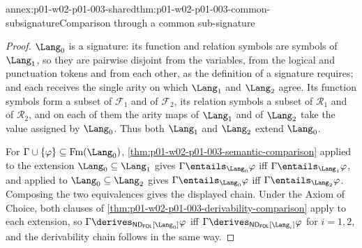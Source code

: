\begin{annexitem}{annex:p01-w02-p01-003-shared}{thm:p01-w02-p01-003-common-subsignature}{Comparison through a common sub-signature}
\begin{proof}
\(\Lang_0\) is a signature: its function and relation symbols are symbols of
\(\Lang_1\), so they are pairwise disjoint from the variables, from the
logical and punctuation tokens and from each other, as the definition of a
signature requires; and each receives the single arity on which
\(\Lang_1\) and \(\Lang_2\) agree. Its function symbols form a subset of
\(\mathcal F_1\) and of \(\mathcal F_2\), its relation symbols a subset of
\(\mathcal R_1\) and of \(\mathcal R_2\), and on each of them the arity maps
of \(\Lang_1\) and of \(\Lang_2\) take the value assigned by \(\Lang_0\).
Thus both \(\Lang_1\) and \(\Lang_2\) extend \(\Lang_0\).

For \(\Gamma\cup\{\varphi\}\subseteq\operatorname{Fm}(\Lang_0)\),
\cref{thm:p01-w02-p01-003-semantic-comparison} applied to the extension
\(\Lang_0\subseteq\Lang_1\) gives
\(\Gamma\entails_{\Lang_0}\varphi\) iff \(\Gamma\entails_{\Lang_1}\varphi\),
and applied to \(\Lang_0\subseteq\Lang_2\) gives
\(\Gamma\entails_{\Lang_0}\varphi\) iff \(\Gamma\entails_{\Lang_2}\varphi\).
Composing the two equivalences gives the displayed chain. Under the Axiom of
Choice, both clauses of
\cref{thm:p01-w02-p01-003-derivability-comparison} apply to each extension, so
\(\Gamma\derives_{\mathsf{ND}_{\mathsf{FOL}}[\Lang_0]}\varphi\) iff
\(\Gamma\derives_{\mathsf{ND}_{\mathsf{FOL}}[\Lang_i]}\varphi\) for
\(i=1,2\), and the derivability chain follows in the same way.
\end{proof}
\end{annexitem}

